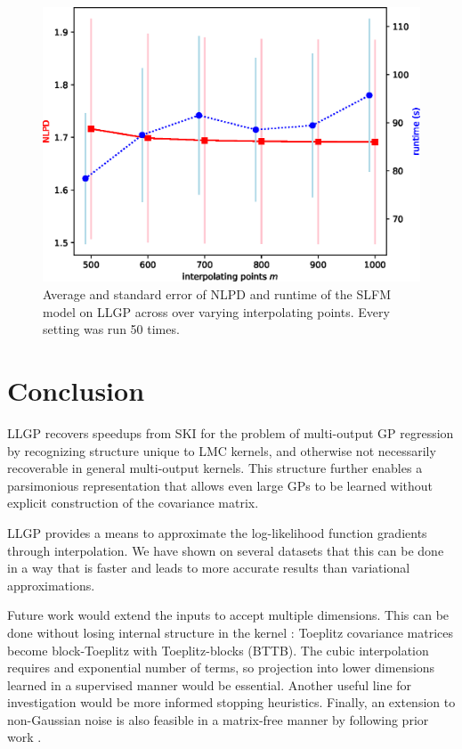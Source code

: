 \documentclass{article}
\begin{document}
\begin{figure}[!ht]
\vskip 0.2in
\begin{center}
\centerline{\includegraphics[width=\columnwidth]{m_time_nlpd.eps}}
\caption{Average and standard error of NLPD and runtime of the SLFM model on LLGP across over varying interpolating points. Every setting was run 50 times.}
\label{fig:llgpweather}
\end{center}
\vskip -0.2in
\end{figure}
\section{Conclusion}\label{conclusion}

LLGP recovers speedups from SKI \cite{kiss-gp} for the problem of multi-output GP regression by recognizing structure unique to LMC kernels, and otherwise not necessarily recoverable in general multi-output kernels. This structure further enables a parsimonious representation that allows even large GPs to be learned without explicit construction of the covariance matrix.

LLGP provides a means to approximate the log-likelihood function gradients through interpolation. We have shown on several datasets that this can be done in a way that is faster and leads to more accurate results than variational approximations.

Future work would extend the inputs to accept multiple dimensions. This can be done without losing internal structure in the kernel \cite{msgp}: Toeplitz covariance matrices become block-Toeplitz with Toeplitz-blocks (BTTB). The cubic interpolation requires and exponential number of terms, so projection into lower dimensions learned in a supervised manner would be essential. Another useful line for investigation would be more informed stopping heuristics. Finally, an extension to non-Gaussian noise is also feasible in a matrix-free manner by following prior work \cite{cutajar2016preconditioning}.


\end{document}
